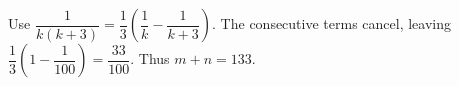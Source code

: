 Use $\dfrac{1}{k(k+3)}=\dfrac{1}{3}(\dfrac{1}{k}-\dfrac{1}{k+3})$. The consecutive terms cancel, leaving $\dfrac{1}{3}(1-\dfrac{1}{100})=\dfrac{33}{100}$. Thus $\boxed{m+n=133}$.
